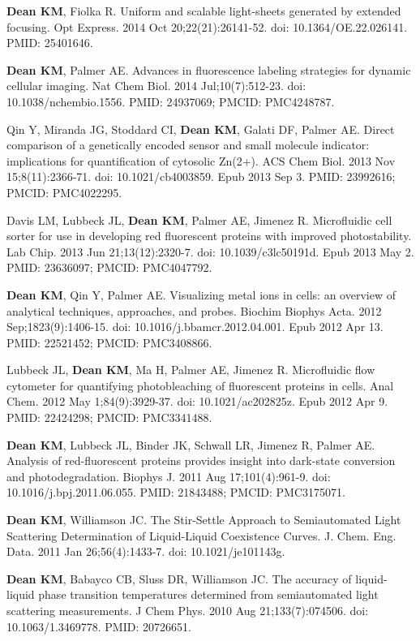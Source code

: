 \begin{etaremune}
\item \textbf{Dean KM}, Fiolka R. Uniform and scalable light-sheets generated by extended focusing. Opt Express. 2014 Oct 20;22(21):26141-52. doi: 10.1364/OE.22.026141. PMID: 25401646.

\item \textbf{Dean KM}, Palmer AE. Advances in fluorescence labeling strategies for dynamic cellular imaging. Nat Chem Biol. 2014 Jul;10(7):512-23. doi: 10.1038/nchembio.1556. PMID: 24937069; PMCID: PMC4248787.

\item Qin Y, Miranda JG, Stoddard CI, \textbf{Dean KM}, Galati DF, Palmer AE. Direct comparison of a genetically encoded sensor and small molecule indicator: implications for quantification of cytosolic Zn(2+). ACS Chem Biol. 2013 Nov 15;8(11):2366-71. doi: 10.1021/cb4003859. Epub 2013 Sep 3. PMID: 23992616; PMCID: PMC4022295.

\item Davis LM, Lubbeck JL, \textbf{Dean KM}, Palmer AE, Jimenez R. Microfluidic cell sorter for use in developing red fluorescent proteins with improved photostability. Lab Chip. 2013 Jun 21;13(12):2320-7. doi: 10.1039/c3lc50191d. Epub 2013 May 2. PMID: 23636097; PMCID: PMC4047792.

\item \textbf{Dean KM}, Qin Y, Palmer AE. Visualizing metal ions in cells: an overview of analytical techniques, approaches, and probes. Biochim Biophys Acta. 2012 Sep;1823(9):1406-15. doi: 10.1016/j.bbamcr.2012.04.001. Epub 2012 Apr 13. PMID: 22521452; PMCID: PMC3408866.

\item Lubbeck JL, \textbf{Dean KM}, Ma H, Palmer AE, Jimenez R. Microfluidic flow cytometer for quantifying photobleaching of fluorescent proteins in cells. Anal Chem. 2012 May 1;84(9):3929-37. doi: 10.1021/ac202825z. Epub 2012 Apr 9. PMID: 22424298; PMCID: PMC3341488.

\item \textbf{Dean KM}, Lubbeck JL, Binder JK, Schwall LR, Jimenez R, Palmer AE. Analysis of red-fluorescent proteins provides insight into dark-state conversion and photodegradation. Biophys J. 2011 Aug 17;101(4):961-9. doi: 10.1016/j.bpj.2011.06.055. PMID: 21843488; PMCID: PMC3175071.

\item \textbf{Dean KM}, Williamson JC. The Stir-Settle Approach to Semiautomated Light Scattering Determination of Liquid-Liquid Coexistence Curves.  J. Chem. Eng. Data.  2011 Jan 26;56(4):1433-7. doi: 10.1021/je101143g.

\item \textbf{Dean KM}, Babayco CB, Sluss DR, Williamson JC. The accuracy of liquid-liquid phase transition temperatures determined from semiautomated light scattering measurements. J Chem Phys. 2010 Aug 21;133(7):074506. doi: 10.1063/1.3469778. PMID: 20726651.

\end{etaremune}

